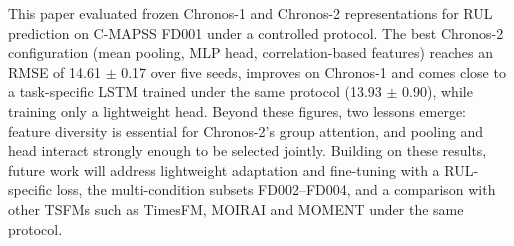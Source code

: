 \documentclass{svproc}
\begin{document}
This paper evaluated frozen Chronos-1 and Chronos-2 representations for
RUL prediction on C-MAPSS FD001 under a controlled protocol. The best
Chronos-2 configuration (mean pooling, MLP head, correlation-based
features) reaches an RMSE of 14.61 $\pm$ 0.17 over five seeds, improves
on Chronos-1 and comes close to a task-specific LSTM trained under the
same protocol (13.93 $\pm$ 0.90), while training only a lightweight head. Beyond
these figures, two lessons emerge: feature diversity is essential for
Chronos-2's group attention, and pooling and head interact strongly
enough to be selected jointly. Building on these results, future work
will address lightweight adaptation and fine-tuning with a RUL-specific loss, the multi-condition
subsets FD002--FD004, and a comparison with other TSFMs such as TimesFM,
MOIRAI and MOMENT under the same protocol.



\end{document}
